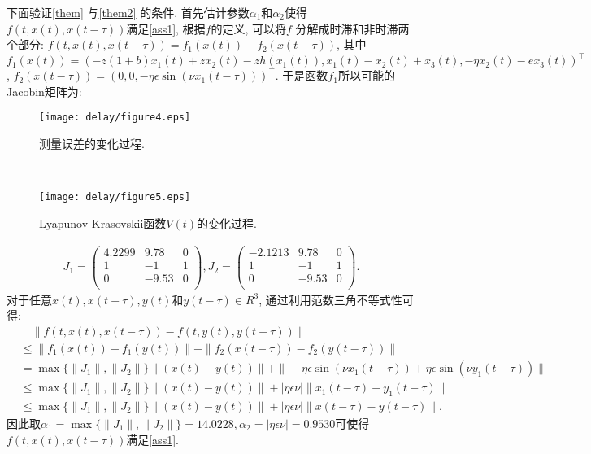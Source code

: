 下面验证\autoref{them} 与\autoref{them2} 的条件. 首先估计参数$\alpha_1$和$\alpha_2$使得$f(t,x(t),x(t-\tau))$满足\autoref{ass1}, 根据$f$的定义, 可以将$f$ 分解成时滞和非时滞两个部分: $f(t,x(t),x(t-\tau))=f_1(x(t))+f_2(x(t-\tau))$, 其中$f_1(x(t))=(-z(1+b)x_1(t)+zx_2(t)-zh(x_1(t)),x_1(t)-x_2(t)+x_3(t),-\eta x_2(t)-ex_3(t))^\top$, $f_2(x(t-\tau))=(0,0,-\eta\epsilon\sin(\nu x_1(t-\tau)))^\top$. 于是函数$f_1$所以可能的Jacobin矩阵为:
\begin{figure}[!htb]
\begin{minipage}[t]{0.48\linewidth}
\centering
\texttt{[image: delay/figure4.eps]}
\caption{测量误差的变化过程.}
\label{measurerror}
\end{minipage}~~
\begin{minipage}[t]{0.48\linewidth}
\centering
\texttt{[image: delay/figure5.eps]}
\caption{Lyapunov-Krasovskii函数$V (t)$的变化过程.}\label{vt}
\end{minipage}
\end{figure}
       \begin{align*}
        J_1=\left(
              \begin{array}{ccc}
                4.2299 &  9.78 & 0 \\
                1 & -1 & 1 \\
                0 &  -9.53 & 0 \\
              \end{array}
            \right),
        J_2=\left(
              \begin{array}{ccc}
                -2.1213 & 9.78 & 0 \\
                1 & -1 & 1 \\
                0 &  -9.53 & 0 \\
              \end{array}
            \right).
        \end{align*}
        对于任意$x(t),x(t-\tau),y(t)$和$y(t-\tau)\in R^3$, 通过利用范数三角不等式性可得:
        \begin{align*}
        &\quad\|f(t,x(t),x(t-\tau))-f(t,y(t),y(t-\tau))\|\\
        &\leq\|f_1(x(t))-f_1(y(t))\|+\|f_2(x(t-\tau))-f_2(y(t-\tau))\|\\
        &=\max\{\|J_1\|,\|J_2\|\}\|(x(t)-y(t))\|
        +\|-\eta\epsilon\sin(\nu
            x_1(t-\tau))+\eta\epsilon\sin(\nu y_1(t-\tau))\|\\
        &\leq\max\{\|J_1\|,\|J_2\|\}\|(x(t)-y(t))\|
        +|\eta\epsilon\nu|\|x_1(t-\tau)-y_1(t-\tau)\|\\
        &\leq\max\{\|J_1\|,\|J_2\|\}\|(x(t)-y(t))\|
        +|\eta\epsilon\nu|\|x(t-\tau)-y(t-\tau)\|.
        \end{align*}
       因此取$\alpha_1=\max\{\|J_1\|,\|J_2\|\}=14.0228, \alpha_2=|\eta\epsilon\nu|=0.9530$可使得$f(t,x(t),x(t-\tau))$满足\autoref{ass1}.

